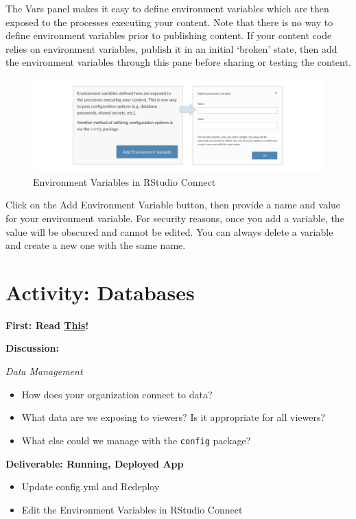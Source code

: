 \documentclass[]{book}
\providecommand{\tightlist}{%
  \setlength{\itemsep}{0pt}\setlength{\parskip}{0pt}}
\theoremstyle{definition}
\theoremstyle{definition}
\theoremstyle{definition}
\theoremstyle{remark}
\begin{document}
The Vars panel makes it easy to define environment variables which are
then exposed to the processes executing your content. Note that there is
no way to define environment variables prior to publishing content. If
your content code relies on environment variables, publish it in an
initial `broken' state, then add the environment variables through this
pane before sharing or testing the content.

\begin{figure}
\centering
\includegraphics{imgs/databases/env-vars.png}
\caption{Environment Variables in RStudio Connect}
\end{figure}

Click on the Add Environment Variable button, then provide a name and
value for your environment variable. For security reasons, once you add
a variable, the value will be obscured and cannot be edited. You can
always delete a variable and create a new one with the same name.

\hypertarget{activity-databases}{%
\section{Activity: Databases}\label{activity-databases}}

\textbf{First: Read
\href{https://db.rstudio.com/best-practices/portable-code/}{This}!}

\textbf{Discussion:}

\emph{Data Management}

\begin{itemize}
\tightlist
\item
  How does your organization connect to data?
\item
  What data are we exposing to viewers? Is it appropriate for all
  viewers?
\item
  What else could we manage with the \texttt{config} package?
\end{itemize}

\textbf{Deliverable: Running, Deployed App}

\begin{itemize}
\tightlist
\item
  Update config.yml and Redeploy
\item
  Edit the Environment Variables in RStudio Connect
\end{itemize}
\end{document}
